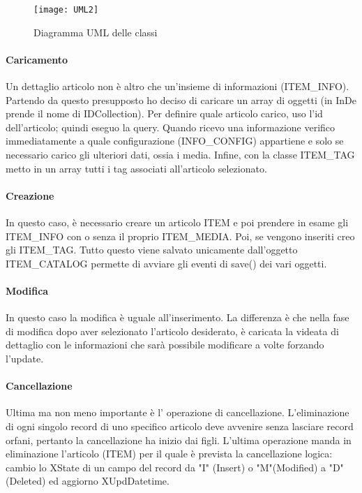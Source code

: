 \begin{figure}[!h] 
	\centering 
	\texttt{[image: UML2]} 
	\caption{Diagramma UML delle classi}
	\label{UML}
\end{figure}

\paragraph{Caricamento}
Un dettaglio articolo non è altro che un'insieme di informazioni (ITEM\_INFO). Partendo da questo presupposto ho deciso di caricare un array di oggetti (in InDe prende il nome di IDCollection).
Per definire quale articolo carico, uso l'id dell'articolo; quindi eseguo la query. Quando ricevo una informazione verifico immediatamente a quale configurazione (INFO\_CONFIG) appartiene e solo se necessario carico gli ulteriori dati, ossia i media. Infine, con la classe ITEM\_TAG metto in un array tutti i tag associati all'articolo selezionato.

\paragraph{Creazione}
In questo caso, è necessario creare un articolo ITEM e poi prendere in esame gli ITEM\_INFO con o senza il proprio ITEM\_MEDIA. Poi, se vengono inseriti creo gli ITEM\_TAG. Tutto questo viene salvato unicamente dall'oggetto ITEM\_CATALOG permette di avviare gli eventi di save() dei vari oggetti.

\paragraph{Modifica}
In questo caso la modifica è uguale all'inserimento. La differenza è che nella fase di modifica dopo aver selezionato l'articolo desiderato, è caricata la videata di dettaglio con le informazioni che sarà possibile modificare a volte forzando l'update.

\paragraph{Cancellazione}
Ultima ma non meno importante è l' operazione di cancellazione. L'eliminazione di ogni singolo record di uno specifico articolo deve avvenire senza lasciare record orfani, pertanto la cancellazione ha inizio dai figli. L'ultima operazione manda in eliminazione l'articolo (ITEM) per il quale è prevista la cancellazione logica: cambio lo XState di un campo del record da "I" (Insert) o "M"(Modified) a "D" (Deleted) ed aggiorno XUpdDatetime.\\


